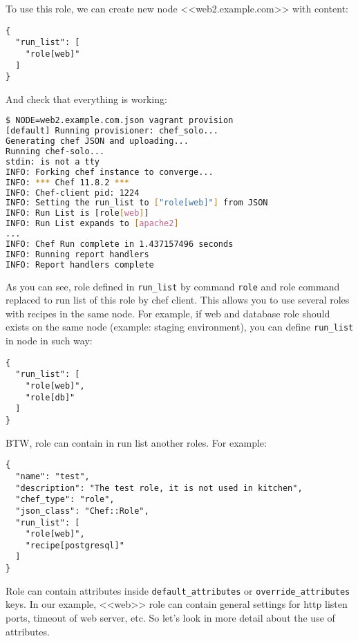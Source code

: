 To use this role, we can create new node <<web2.example.com>> with content:

\begin{lstlisting}[label=lst:my-cloud-role2,title=my-cloud/nodes/web2.example.com.json]
{
  "run_list": [
    "role[web]"
  ]
}
\end{lstlisting}

And check that everything is working:

\begin{lstlisting}[language=Bash,label=lst:my-cloud-role3]
$ NODE=web2.example.com.json vagrant provision
[default] Running provisioner: chef_solo...
Generating chef JSON and uploading...
Running chef-solo...
stdin: is not a tty
INFO: Forking chef instance to converge...
INFO: *** Chef 11.8.2 ***
INFO: Chef-client pid: 1224
INFO: Setting the run_list to ["role[web]"] from JSON
INFO: Run List is [role[web]]
INFO: Run List expands to [apache2]
...
INFO: Chef Run complete in 1.437157496 seconds
INFO: Running report handlers
INFO: Report handlers complete
\end{lstlisting}

As you can see, role defined in \lstinline!run_list! by command \lstinline!role! and role command replaced to run list of this role by chef client. This allows you to use several roles with recipes in the same node. For example, if web and database role should exists on the same node (example: staging environment), you can define \lstinline!run_list! in node in such way:

\begin{lstlisting}[label=lst:my-cloud-role4,title=my-cloud/nodes/web2.example.com.json]
{
  "run_list": [
    "role[web]",
    "role[db]"
  ]
}
\end{lstlisting}

BTW, role can contain in run list another roles. For example:

\begin{lstlisting}[label=lst:my-cloud-role5,title=my-cloud/roles/test.json]
{
  "name": "test",
  "description": "The test role, it is not used in kitchen",
  "chef_type": "role",
  "json_class": "Chef::Role",
  "run_list": [
    "role[web]",
    "recipe[postgresql]"
  ]
}
\end{lstlisting}

Role can contain attributes inside \lstinline!default_attributes! or \lstinline!override_attributes! keys. In our example, <<web>> role can contain general settings for http listen ports, timeout of web server, etc. So let's look in more detail about the use of attributes.
